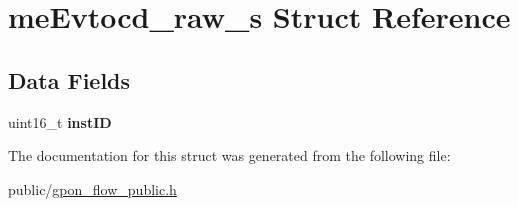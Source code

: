 \hypertarget{structmeEvtocd__raw__s}{}\section{me\+Evtocd\+\_\+raw\+\_\+s Struct Reference}
\label{structmeEvtocd__raw__s}
\subsection*{Data Fields}
\begin{DoxyCompactItemize}
\item 
\mbox{\label{structmeEvtocd__raw__s_a9796f21d8926aaf29a720a28ff98ddfd}} 
uint16\+\_\+t {\bfseries inst\+ID}
\end{DoxyCompactItemize}


The documentation for this struct was generated from the following file\+:\begin{DoxyCompactItemize}
\item 
public/\hyperlink{gpon__flow__public_8h}{gpon\+\_\+flow\+\_\+public.\+h}\end{DoxyCompactItemize}
